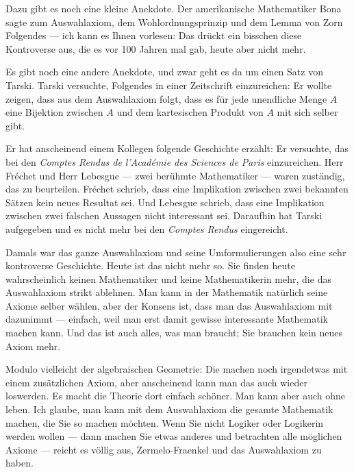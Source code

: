 \begin{spoken-clean}[01:06:40 - 01:08:40]
Dazu gibt es noch eine kleine Anekdote. Der amerikanische Mathematiker Bona sagte zum Auswahlaxiom, dem Wohlordnungsprinzip und dem Lemma von Zorn Folgendes --- ich kann es Ihnen vorlesen:  Das drückt ein bisschen diese Kontroverse aus, die es vor 100 Jahren mal gab, heute aber nicht mehr.
\end{spoken-clean}

\begin{spoken-clean}[01:08:40 - 01:10:40]
Es gibt noch eine andere Anekdote, und zwar geht es da um einen Satz von Tarski. Tarski versuchte, Folgendes in einer Zeitschrift einzureichen: Er wollte zeigen, dass aus dem Auswahlaxiom folgt, dass es für jede unendliche Menge $A$ eine Bijektion zwischen $A$ und dem kartesischen Produkt von $A$ mit sich selber gibt.

Er hat anscheinend einem Kollegen folgende Geschichte erzählt: Er versuchte, das bei den \emph{Comptes Rendus de l'Académie des Sciences de Paris} einzureichen. Herr Fréchet und Herr Lebesgue --- zwei berühmte Mathematiker --- waren zuständig, das zu beurteilen. Fréchet schrieb, dass eine Implikation zwischen zwei bekannten Sätzen kein neues Resultat sei. Und Lebesgue schrieb, dass eine Implikation zwischen zwei falschen Aussagen nicht interessant sei. Daraufhin hat Tarski aufgegeben und es nicht mehr bei den \emph{Comptes Rendus} eingereicht.
\end{spoken-clean}

\begin{spoken-clean}[01:10:40 - 01:12:40]
Damals war das ganze Auswahlaxiom und seine Umformulierungen also eine sehr kontroverse Geschichte. Heute ist das nicht mehr so. Sie finden heute wahrscheinlich keinen Mathematiker und keine Mathematikerin mehr, die das Auswahlaxiom strikt ablehnen. Man kann in der Mathematik natürlich seine Axiome selber wählen, aber der Konsens ist, dass man das Auswahlaxiom mit dazunimmt --- einfach, weil man erst damit gewisse interessante Mathematik machen kann. Und das ist auch alles, was man braucht; Sie brauchen kein neues Axiom mehr.

Modulo vielleicht der algebraischen Geometrie: Die machen noch irgendetwas mit einem zusätzlichen Axiom, aber anscheinend kann man das auch wieder loswerden. Es macht die Theorie dort einfach schöner. Man kann aber auch ohne leben. Ich glaube, man kann mit dem Auswahlaxiom die gesamte Mathematik machen, die Sie so machen möchten. Wenn Sie nicht Logiker oder Logikerin werden wollen --- dann machen Sie etwas anderes und betrachten alle möglichen Axiome --- reicht es völlig aus, Zermelo-Fraenkel und das Auswahlaxiom zu haben.
\end{spoken-clean}

